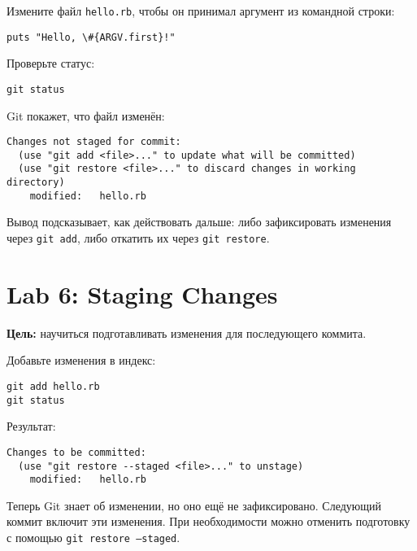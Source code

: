 \documentclass[a4paper,12pt]{report}
\begin{document}
Измените файл \texttt{hello.rb}, чтобы он принимал аргумент из командной строки:

\begin{verbatim}
puts "Hello, \#{ARGV.first}!"
\end{verbatim}


Проверьте статус:
\begin{verbatim}
git status
\end{verbatim}

Git покажет, что файл изменён:
\begin{verbatim}
Changes not staged for commit:
  (use "git add <file>..." to update what will be committed)
  (use "git restore <file>..." to discard changes in working directory)
	modified:   hello.rb
\end{verbatim}

Вывод подсказывает, как действовать дальше: либо зафиксировать изменения через \texttt{git add}, либо откатить их через \texttt{git restore}.


\section{Lab 6: Staging Changes}
\textbf{Цель:} научиться подготавливать изменения для последующего коммита.

Добавьте изменения в индекс:
\begin{verbatim}
git add hello.rb
git status
\end{verbatim}

Результат:
\begin{verbatim}
Changes to be committed:
  (use "git restore --staged <file>..." to unstage)
	modified:   hello.rb
\end{verbatim}

Теперь Git знает об изменении, но оно ещё не зафиксировано. Следующий коммит включит эти изменения. При необходимости можно отменить подготовку с помощью \texttt{git restore --staged}.

\end{document}
